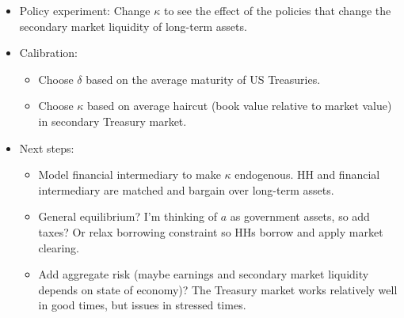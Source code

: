 \documentclass{article}
\begin{document}
\begin{itemize}
\item Policy experiment: Change $\kappa$ to see the effect of the policies that change the secondary market liquidity of long-term assets.

\item Calibration:

\begin{itemize}
\item Choose $\delta$ based on the average maturity of US Treasuries.
\item Choose $\kappa$ based on average haircut (book value relative to market value) in secondary Treasury market.
\end{itemize}

\item Next steps:

\begin{itemize}
\item Model financial intermediary to make $\kappa$ endogenous. HH and financial intermediary are matched and bargain over long-term assets.
\item General equilibrium? I'm thinking of $a$ as government assets, so add taxes?  Or relax borrowing constraint so HHs borrow and apply market clearing.
\item Add aggregate risk (maybe earnings and secondary market liquidity depends on state of economy)? The Treasury market works relatively well in good times, but issues in stressed times.
\end{itemize}


\end{itemize}
\end{document}
